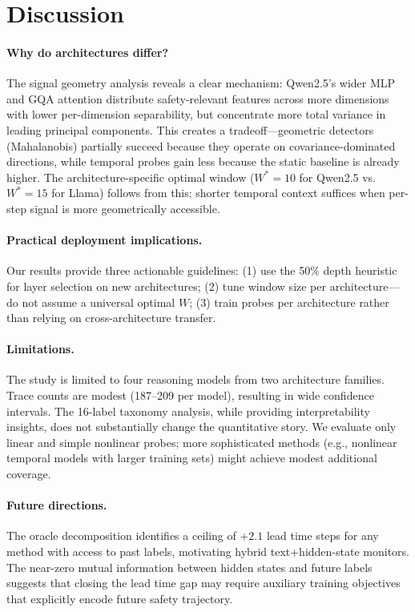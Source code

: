 \documentclass[11pt,a4paper]{article}
\begin{document}
\section{Discussion}
\label{sec:discussion}

\paragraph{Why do architectures differ?}
The signal geometry analysis reveals a clear mechanism: Qwen2.5's wider MLP and GQA attention distribute safety-relevant features across more dimensions with lower per-dimension separability, but concentrate more total variance in leading principal components. This creates a tradeoff---geometric detectors (Mahalanobis) partially succeed because they operate on covariance-dominated directions, while temporal probes gain less because the static baseline is already higher. The architecture-specific optimal window ($W^*{=}10$ for Qwen2.5 vs.\ $W^*{=}15$ for Llama) follows from this: shorter temporal context suffices when per-step signal is more geometrically accessible.

\paragraph{Practical deployment implications.}
Our results provide three actionable guidelines: (1) use the 50\% depth heuristic for layer selection on new architectures; (2) tune window size per architecture---do not assume a universal optimal $W$; (3) train probes per architecture rather than relying on cross-architecture transfer.

\paragraph{Limitations.}
The study is limited to four reasoning models from two architecture families. Trace counts are modest (187--209 per model), resulting in wide confidence intervals. The 16-label taxonomy analysis, while providing interpretability insights, does not substantially change the quantitative story. We evaluate only linear and simple nonlinear probes; more sophisticated methods (e.g., nonlinear temporal models with larger training sets) might achieve modest additional coverage.

\paragraph{Future directions.}
The oracle decomposition identifies a ceiling of $+2.1$ lead time steps for any method with access to past labels, motivating hybrid text+hidden-state monitors. The near-zero mutual information between hidden states and future labels suggests that closing the lead time gap may require auxiliary training objectives that explicitly encode future safety trajectory.
\end{document}
